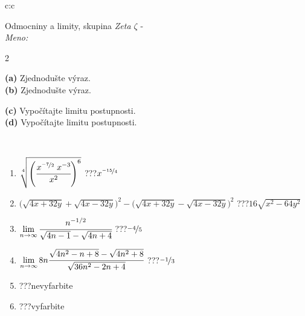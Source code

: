 \documentclass[10pt]{report}
\begin{document}
\begin{tabular}{c:c}
\begin{minipage}[c][104.5mm][t]{0.5\linewidth}
\begin{center}
\vspace{7mm}
{\huge Odmocniny a limity, skupina \textit{Zeta $\zeta$} -}\\[5mm]
\textit{Meno:}\phantom{xxxxxxxxxxxxxxxxxxxxxxxxxxxxxxxxxxxxxxxxxxxxxxxxxxxxxxxxxxxxxxxxx}\\[5mm]
\begin{minipage}{0.95\linewidth}
\begin{center}
{\small \begin{multicols}{2} \raggedright
\textbf{(a)} Zjednodušte výraz. \\[1mm]
\textbf{(b)} Zjednodušte výraz. \par \columnbreak
\textbf{(c)} Vypočítajte limitu postupnosti. \\[1mm]
\textbf{(d)} Vypočítajte limitu postupnosti.
\end{multicols}
}
\end{center}
\end{minipage}
\\[4mm]
\begin{minipage}{0.79\linewidth}
\begin{center}
\begin{varwidth}{\linewidth}
\begin{enumerate}
\small
\item $\sqrt[4]{\left(\cfrac{x^{\nicefrac{-7}{2}}\;x^{-3}}{x^{2}}\right)^{6}}$\quad \dotfill\; ???\;\dotfill \quad $x^{\nicefrac{-15}{4}}$
\item {\footnotesize{\scriptsize$\big(\sqrt{4x+32y}+\sqrt{4x-32y}\big)^2-\big(\sqrt{4x+32y}-\sqrt{4x-32y}\big)^2$}\quad \dotfill\; ???\;\dotfill \quad $16\sqrt{x^2-64y^2}$}
\item $\lim\limits_{n\to\infty}\cfrac{n^{-1/2}}{\sqrt{4n-1}-\sqrt{4n+4}}$\quad \dotfill\; ???\;\dotfill \quad $\nicefrac{-4}{5}$
\item $\lim\limits_{n\to\infty}8n\cfrac{\sqrt{4n^2-n+8}-\sqrt{4n^2+8}}{\sqrt{36n^2-2n+4}}$\quad \dotfill\; ???\;\dotfill \quad $\nicefrac{-1}{3}$
\item \quad \dotfill\; ???\;\dotfill \quad nevyfarbite
\item \quad \dotfill\; ???\;\dotfill \quad vyfarbite
\end{enumerate}
\end{varwidth}
\end{center}

\end{minipage}
\end{center}
\end{minipage}
\end{tabular}
\end{document}
